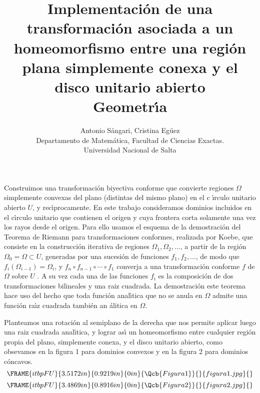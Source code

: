 \documentclass[a4paper,spanish]{article}
\begin{document}
\title{\textbf{Implementaci\'{o}n de una transformaci\'{o}n asociada a un
homeomorfismo entre una regi\'{o}n plana simplemente conexa y el disco
unitario abierto}\\
Geometr\'{\i}a}
\author{Antonio S\'{a}ngari, Cristina Eg\"{u}ez \\
Departamento de Matem\'{a}tica, Facultad de Ciencias Exactas. \\
Universidad Nacional de Salta}
\maketitle

Construimos una transformaci\'{o}n biyectiva conforme que convierte regiones 
$\Omega $ simplemente convexas del plano (distintas del mismo plano) en el c%
\'{\i}rculo unitario abierto $U$, y rec\'{\i}procamente. En este trabajo
consideramos dominios incluidos en el c\'{\i}rculo unitario que contienen el
origen y cuya frontera corta solamente una vez los rayos desde el origen.
Para ello usamos el esquema de la demostraci\'{o}n del Teorema de Riemann
para transformaciones conformes, realizada por Koebe, que consiste en la
construcci\'{o}n iterativa de regiones $\Omega _{1},$$\Omega _{2},\dots $, a
partir de la regi\'{o}n $\Omega _{0}=\Omega \subset U$, generadas por una
sucesi\'{o}n de funciones $f_{1},f_{2},\dots $, de modo que $f_{i}\left(
\Omega _{i-1}\right) =\Omega _{i}$, y $f_{n}\circ f_{n-1}\circ \cdots \circ
f_{1}$ converja a una transformaci\'{o}n conforme $f$ de $\Omega $ sobre $U$%
. A su vez cada una de las funciones $f_{i}$ es la composici\'{o}n de dos
transformaciones bilineales y una raiz cuadrada. La demostraci\'{o}n este
teorema hace uso del hecho que toda funci\'{o}n anal\'{\i}tica que no se
anula en $\Omega $ admite una funci\'{o}n ra\'{\i}z cuadrada tambi\'{e}n an%
\'{a}litica en $\Omega $.

Planteamos una rotaci\'{o}n al semiplano de la derecha que nos permite
aplicar luego una raiz cuadrada anal\'{\i}tica, y lograr as\'{\i} un
homeomorfismo entre cualquier regi\'{o}n propia del plano, simplemente
conexa, y el disco unitario abierto, como obsevamos en la figura 1 para
dominios convexos y en la figura 2 para dominios c\'{o}ncavos.%
\[
\FRAME{itbpFU}{3.5172in}{0.9219in}{0in}{\Qcb{{\protect\small Figura 1}}}{}{%
figura1.jpg}{\special{language "Scientific Word";type
"GRAPHIC";maintain-aspect-ratio TRUE;display "USEDEF";valid_file "F";width
3.5172in;height 0.9219in;depth 0in;original-width 3.896in;original-height
0.9997in;cropleft "0";croptop "1";cropright "1";cropbottom "0";filename
'figura1.jpg';file-properties "XNPEU";}}
\]%
\[
\FRAME{itbpFU}{3.4869in}{0.8916in}{0in}{\Qcb{{\protect\small Figura 2}}}{}{%
figura2.jpg}{\special{language "Scientific Word";type
"GRAPHIC";maintain-aspect-ratio TRUE;display "USEDEF";valid_file "F";width
3.4869in;height 0.8916in;depth 0in;original-width 4.0309in;original-height
1.0101in;cropleft "0";croptop "1";cropright "1";cropbottom "0";filename
'figura2.jpg';file-properties "XNPEU";}}
\]
\end{document}
